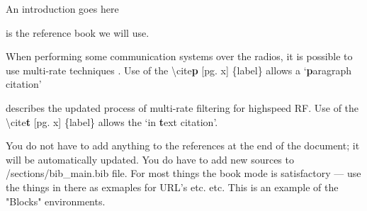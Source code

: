 
An introduction goes here
\vspace{3em}

\citet{solomon2010} is the reference book we will use.
\vspace{1em}

When performing some communication systems over the radios, it is possible to use multi-rate techniques \citep[pg. 54]{harris2004}. Use of the \textbackslash cite\textbf{p} [pg. x] \{label\} allows a `\textbf{p}aragraph citation'
\vspace{1em}

\citet{harris2021} describes the updated process of multi-rate filtering for highspeed RF. Use of the \textbackslash cite\textbf{t} [pg. x] \{label\} allows the `in \textbf{t}ext citation'.
\vspace{1em}

You do not have to add anything to the references at the end of the document; it will be automatically updated.
You do have to add new sources to /sections/bib\_main.bib file. For most things the book mode is satisfactory --- use the things in there as exmaples for URL's etc. etc. 
\clearpage
This is an example of the "Blocks" environments.
\FloatBarrier

